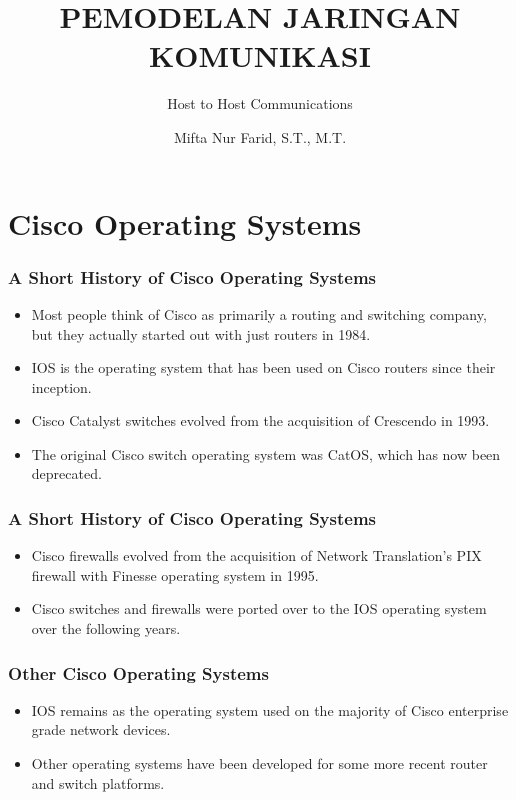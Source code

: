 \documentclass[pdflatex,compress]{beamer}
\title{PEMODELAN JARINGAN KOMUNIKASI}
\subtitle{Host to Host Communications}
\author{Mifta Nur Farid, S.T., M.T.}
\begin{document}
\maketitle

\section{Cisco Operating Systems}

\begin{frame}
	\frametitle{A Short History of Cisco Operating Systems}
	\begin{itemize}
		\item Most people think of Cisco as primarily a routing and switching company, but they actually started out with just routers in 1984.
		\item IOS is the operating system that has been used on Cisco routers since their inception.
		\item Cisco Catalyst switches evolved from the acquisition of Crescendo in 1993.
		\item The original Cisco switch operating system was CatOS, which has now been deprecated.
	\end{itemize}
\end{frame}

\begin{frame}
	\frametitle{A Short History of Cisco Operating Systems}
	\begin{itemize}
		\item Cisco firewalls evolved from the acquisition of Network Translation’s PIX firewall with Finesse operating system in 1995.
		\item Cisco switches and firewalls were ported over to the IOS operating system over the following years.
	\end{itemize}
\end{frame}

\begin{frame}
	\frametitle{Other Cisco Operating Systems}
	\begin{itemize}
		\item IOS remains as the operating system used on the majority of Cisco enterprise grade network devices.
		\item Other operating systems have been developed for some more recent router and switch platforms.
	\end{itemize}
\end{frame}
\end{document}
